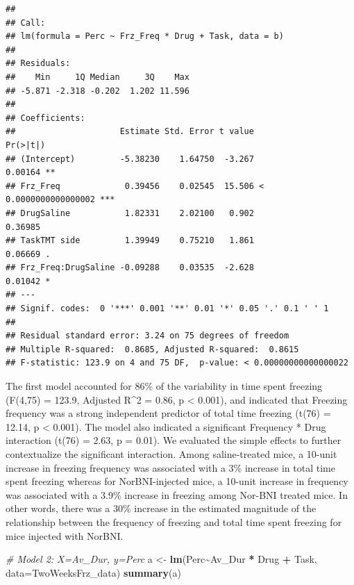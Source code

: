 \documentclass[
]{book}
\newenvironment{Shaded}{\begin{snugshade}}{\end{snugshade}}
\newcommand{\AttributeTok}[1]{\textcolor[rgb]{0.13,0.29,0.53}{#1}}
\newcommand{\CommentTok}[1]{\textcolor[rgb]{0.56,0.35,0.01}{\textit{#1}}}
\newcommand{\FunctionTok}[1]{\textcolor[rgb]{0.13,0.29,0.53}{\textbf{#1}}}
\newcommand{\NormalTok}[1]{#1}
\newcommand{\OtherTok}[1]{\textcolor[rgb]{0.56,0.35,0.01}{#1}}
\newcommand{\SpecialCharTok}[1]{\textcolor[rgb]{0.81,0.36,0.00}{\textbf{#1}}}
\begin{document}
\begin{verbatim}
## 
## Call:
## lm(formula = Perc ~ Frz_Freq * Drug + Task, data = b)
## 
## Residuals:
##    Min     1Q Median     3Q    Max 
## -5.871 -2.318 -0.202  1.202 11.596 
## 
## Coefficients:
##                     Estimate Std. Error t value             Pr(>|t|)    
## (Intercept)         -5.38230    1.64750  -3.267              0.00164 ** 
## Frz_Freq             0.39456    0.02545  15.506 < 0.0000000000000002 ***
## DrugSaline           1.82331    2.02100   0.902              0.36985    
## TaskTMT side         1.39949    0.75210   1.861              0.06669 .  
## Frz_Freq:DrugSaline -0.09288    0.03535  -2.628              0.01042 *  
## ---
## Signif. codes:  0 '***' 0.001 '**' 0.01 '*' 0.05 '.' 0.1 ' ' 1
## 
## Residual standard error: 3.24 on 75 degrees of freedom
## Multiple R-squared:  0.8685, Adjusted R-squared:  0.8615 
## F-statistic: 123.9 on 4 and 75 DF,  p-value: < 0.00000000000000022
\end{verbatim}

The first model accounted for 86\% of the variability in time spent freezing (F(4,75) = 123.9, Adjusted R\^{}2 = 0.86, p \textless{} 0.001), and indicated that Freezing frequency was a strong independent predictor of total time freezing (t(76) = 12.14, p \textless{} 0.001). The model also indicated a significant Frequency * Drug interaction (t(76) = 2.63, p = 0.01). We evaluated the simple effects to further contextualize the significant interaction. Among saline-treated mice, a 10-unit increase in freezing frequency was associated with a 3\% increase in total time spent freezing whereas for NorBNI-injected mice, a 10-unit increase in frequency was associated with a 3.9\% increase in freezing among Nor-BNI treated mice. In other words, there was a 30\% increase in the estimated magnitude of the relationship between the frequency of freezing and total time spent freezing for mice injected with NorBNI.

\begin{Shaded}
\begin{Highlighting}[]
\CommentTok{\# Model 2: X=Av\_Dur, y=Perc}
\NormalTok{a }\OtherTok{\textless{}{-}} \FunctionTok{lm}\NormalTok{(Perc}\SpecialCharTok{\textasciitilde{}}\NormalTok{Av\_Dur }\SpecialCharTok{*}\NormalTok{ Drug }\SpecialCharTok{+}\NormalTok{ Task, }\AttributeTok{data=}\NormalTok{TwoWeeksFrz\_data)}
\FunctionTok{summary}\NormalTok{(a)}
\end{Highlighting}
\end{Shaded}
\end{document}
